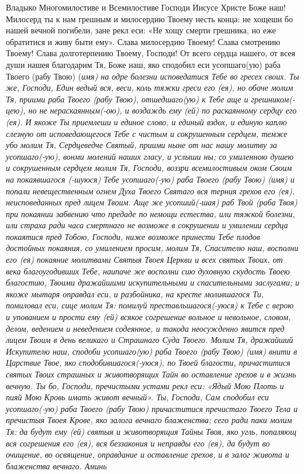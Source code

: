 Владыко Многомилостиве и Всемилостиве Господи Иисусе Христе Боже наш! Милосерд ты к нам грешным и милосердию Твоему несть конца: не хощеши бо нашей вечной погибели, зане рекл еси: «Не хощу смерти грешника, но еже обратитися и живу быти ему». Слава милосердию Твоему! Слава смотрению Твоему! Слава долготерпению Твоему, Господи! От всего сердца нашего, от всея души нашея благодарим Тя, Боже наш, яко сподобил еси усопшаго(ую) раба Твоего (рабу Твою) (\itshape имя\normalfont{}) на одре болезни исповедатися Тебе во гресех своих. Ты же, Господи, Един ведый вся, веси, коль тяжки греси его (ея), но обаче молим Тя, приими раба Твоего (рабу Твою), отшедшаго(ую) к Тебе аще и грешником(-цею), но не нераскаянным(-ою), и воздаждь ему (ей) по раскаянному сердцу его (ея). И якоже Ты приемлеши и единое слово, и единый вздох, и единую каплю слезную от исповедающегося Тебе с чистым и сокрушенным сердцем, темже убо молим Тя, Сердцеведче Святый, приими ныне от нас нашу молитву за усопшаго(-ую), вонми молений наших гласу, и услыши ны; со умиленною душею и сокрушенным сердцем молим Тя, Господи, воззри всемилостивым оком Своим на покаявшагося (-шуюся) Тебе усопшаго(-ую) раба Твоего (рабу Твою) (имя) и попали невещественным огнем Духа Твоего Святаго вся терния грехов его (ея), неисповеданных пред лицем Твоим. Аще же усопший(-шая) раб Твой (раба Твоя) при покаянии забвению что предаде по немощи естества, или тяжкой болезни, или страха ради часа смертнаго не возможе в сокрушении и умилении сердца покаятися пред Тобою, Господи, ниже возможе принести Тебе плодов достойных покаяния, со умилением просим, молим Тя, Спасителю наш, восполни его (ея) покаяние молитвами Святыя Твоея Церкви и всех святых Твоих, от века благоугодивших Тебе, наипаче же восполни сию духовную скудость Твоею благостию, Твоими дражайшими искупительными и спасительными заслугами; и якоже мытаря оправдал еси, и разбойника, на кресте молившагося Ти, помиловал еси, сице молим Тя: помилуй преставльшагося(-уюся) к Тебе с верою и упованием и прости ему (ей) всякое согрешение вольное и невольное, словом, делом, ведением и неведением содеянное, и такода неосужденно явится пред лицем Твоим в день великаго и Страшнаго Суда Твоего. Молим Тя, дражайший Искупителю наш, сподоби усопшаго(ую) раба Твоего (рабу Твою) (\itshape имя\normalfont{}) внити в Царствие Твое, яко сподобившагося(-уюся), по Твоей благости, причаститися святых Твоих страшных и животворящих Тайн во оставление грехов и в жизнь вечную. Ты бо, Господи, пречистыми устами рекл еси: «Ядый Мою Плоть и пияй Мою Кровь имать живот вечный». Ты, Господи, Сам сподобил еси усопшаго(-ую) раба Твоего (рабу Твою) причаститися пречистаго Твоего Тела и пречистыя Твоея Крове, яко залога вечнаго блаженства; сего ради паки молим Тя: да будут ему (ей) святыя и животворящия Тайны Твоя, яко угль, попаляющ вся согрешения его (ея), вся беззакония и неправды его (ея), да будут во очищение, во освящение, оправдание и оставление грехов, и в залог живота и блаженства вечнаго. Аминь 
\mychapterending

